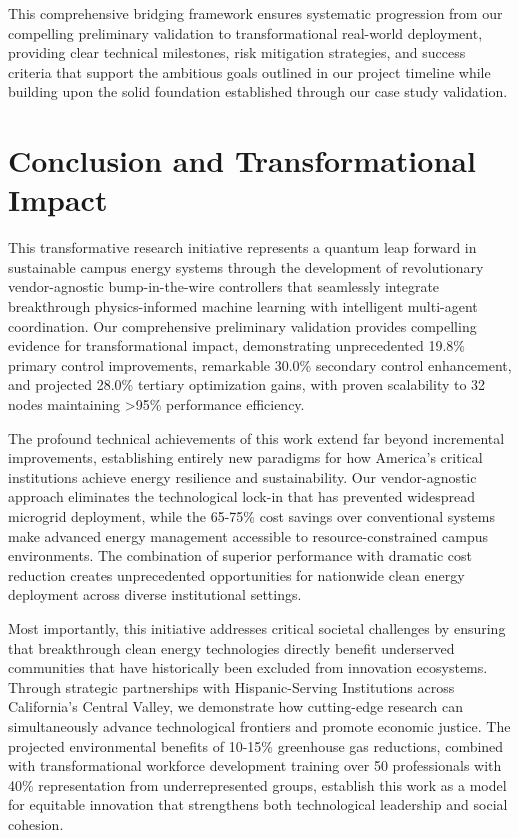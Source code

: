 \documentclass[12pt]{article}
\begin{document}
This comprehensive bridging framework ensures systematic progression from our compelling preliminary validation to transformational real-world deployment, providing clear technical milestones, risk mitigation strategies, and success criteria that support the ambitious goals outlined in our project timeline while building upon the solid foundation established through our case study validation.

\section{Conclusion and Transformational Impact}

This transformative research initiative represents a quantum leap forward in sustainable campus energy systems through the development of revolutionary vendor-agnostic bump-in-the-wire controllers that seamlessly integrate breakthrough physics-informed machine learning with intelligent multi-agent coordination. Our comprehensive preliminary validation provides compelling evidence for transformational impact, demonstrating unprecedented 19.8\% primary control improvements, remarkable 30.0\% secondary control enhancement, and projected 28.0\% tertiary optimization gains, with proven scalability to 32 nodes maintaining >95\% performance efficiency.

The profound technical achievements of this work extend far beyond incremental improvements, establishing entirely new paradigms for how America's critical institutions achieve energy resilience and sustainability. Our vendor-agnostic approach eliminates the technological lock-in that has prevented widespread microgrid deployment, while the 65-75\% cost savings over conventional systems make advanced energy management accessible to resource-constrained campus environments. The combination of superior performance with dramatic cost reduction creates unprecedented opportunities for nationwide clean energy deployment across diverse institutional settings.

Most importantly, this initiative addresses critical societal challenges by ensuring that breakthrough clean energy technologies directly benefit underserved communities that have historically been excluded from innovation ecosystems. Through strategic partnerships with Hispanic-Serving Institutions across California's Central Valley, we demonstrate how cutting-edge research can simultaneously advance technological frontiers and promote economic justice. The projected environmental benefits of 10-15\% greenhouse gas reductions, combined with transformational workforce development training over 50 professionals with 40\% representation from underrepresented groups, establish this work as a model for equitable innovation that strengthens both technological leadership and social cohesion.
\end{document}

